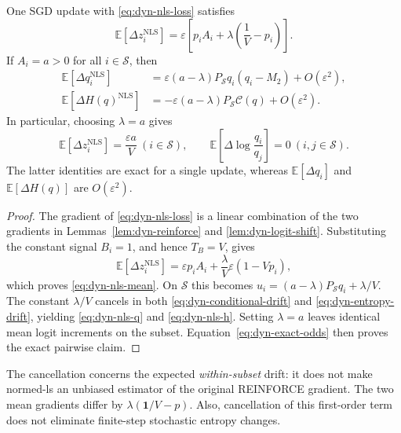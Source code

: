 \begin{lemma}
\label{lem:dyn-normed-ls}
One SGD update with \eqref{eq:dyn-nls-loss} satisfies
\begin{equation}
 \mathbb E[\Delta z_i^{\mathrm{NLS}}]
 =\varepsilon\left[p_iA_i+\lambda\left(\frac1V-p_i\right)\right].
 \label{eq:dyn-nls-mean}
\end{equation}
If $A_i=a>0$ for all $i\in\mathcal S$, then
\begin{align}
 \mathbb E[\Delta q_i^{\mathrm{NLS}}]
 &=\varepsilon(a-\lambda)P_{\mathcal S}q_i(q_i-M_2)
       +O(\varepsilon^2),
 \label{eq:dyn-nls-q}\\
 \mathbb E[\Delta H(q)^{\mathrm{NLS}}]
 &=-\varepsilon(a-\lambda)P_{\mathcal S}\mathcal C(q)
       +O(\varepsilon^2).
 \label{eq:dyn-nls-h}
\end{align}
In particular, choosing $\lambda=a$ gives
\begin{equation}
 \mathbb E[\Delta z_i^{\mathrm{NLS}}]=\frac{\varepsilon a}{V}
 \ (i\in\mathcal S),\qquad
 \mathbb E\left[\Delta\log\frac{q_i}{q_j}\right]=0
 \ (i,j\in\mathcal S).
 \label{eq:dyn-nls-cancellation}
\end{equation}
The latter identities are exact for a single update, whereas
$\mathbb E[\Delta q_i]$ and $\mathbb E[\Delta H(q)]$ are
$O(\varepsilon^2)$.
\end{lemma}

\begin{proof}
The gradient of \eqref{eq:dyn-nls-loss} is a linear combination of the
two gradients in Lemmas~\ref{lem:dyn-reinforce} and
\ref{lem:dyn-logit-shift}. Substituting the constant signal
$B_i=1$, and hence $T_B=V$, gives
\[
 \mathbb E[\Delta z_i^{\mathrm{NLS}}]
 =\varepsilon p_iA_i+\frac{\lambda}{V}\varepsilon(1-Vp_i),
\]
which proves \eqref{eq:dyn-nls-mean}. On $\mathcal S$ this becomes
$u_i=(a-\lambda)P_{\mathcal S}q_i+\lambda/V$. The constant
$\lambda/V$ cancels in both \eqref{eq:dyn-conditional-drift} and
\eqref{eq:dyn-entropy-drift}, yielding
\eqref{eq:dyn-nls-q} and \eqref{eq:dyn-nls-h}. Setting
$\lambda=a$ leaves identical mean logit increments on the subset.
Equation~\ref{eq:dyn-exact-odds} then proves the exact pairwise claim.
\end{proof}

The cancellation concerns the expected \emph{within-subset} drift:
it does not make normed-ls an unbiased estimator of the original
REINFORCE gradient. The two mean gradients differ by
$\lambda(\mathbf 1/V-p)$. Also, cancellation of this first-order term
does not eliminate finite-step stochastic entropy changes.

